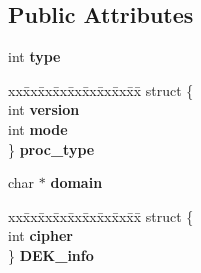\subsection*{Public Attributes}
\begin{DoxyCompactItemize}
\item 
\mbox{\label{structpem__ctx__st_aa68441b2d1bdccccc8b598a582b42793}} 
int {\bfseries type}
\item 
\mbox{\label{structpem__ctx__st_a515e59bc6ba76f8721b337501c6013a4}} 
\begin{tabbing}
xx\=xx\=xx\=xx\=xx\=xx\=xx\=xx\=xx\=\kill
struct \{\\
\>int {\bfseries version}\\
\>int {\bfseries mode}\\
\} {\bfseries proc\_type}\\

\end{tabbing}\item 
\mbox{\label{structpem__ctx__st_a73398a2c8477476e2e892180d5dc2cfb}} 
char $\ast$ {\bfseries domain}
\item 
\mbox{\label{structpem__ctx__st_ac667dd5c06debf03dd1e6ed23119b823}} 
\begin{tabbing}
xx\=xx\=xx\=xx\=xx\=xx\=xx\=xx\=xx\=\kill
struct \{\\
\>int {\bfseries cipher}\\
\} {\bfseries DEK\_info}\\


\end{tabbing}
\end{DoxyCompactItemize}

